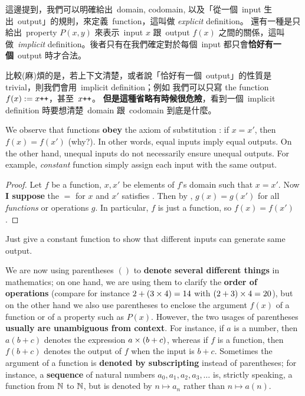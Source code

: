 \begin{note}
這邊提到，我們可以明確給出\ domain, codomain, 以及「從一個\ input 生出\  output」的規則，來定義\ function，這叫做 \emph{explicit} definition。
還有一種是只給出\ property \(P(x, y)\) 來表示\ input \(x\) 跟\ output \(f(x)\) 之間的關係，這叫做\ \emph{implicit} definition。後者只有在我們確定對於每個\ input 都只會\textbf{恰好有一個}\ output 時才合法。
\end{note}

\begin{note}
比較(麻)煩的是，若上下文清楚，或者說「恰好有一個\ output」的性質是 trivial，則我們會用\ implicit definition；例如  我們可以只寫 the function \(f(x) := x\texttt{++}\)，甚至\  \(x\texttt{++}\)。
\textbf{但是這種省略有時候很危險}，看到一個\ implicit definition 時要想清楚\ domain 跟\ codomain 到底是什麼。
\end{note}

\begin{note}
We observe that functions \textbf{obey} the axiom of substitution : if \(x = x'\), then \(f(x) = f(x')\) (why?).
In other words, equal inputs imply equal outputs. On the other hand, unequal inputs do not necessarily ensure unequal outputs.
For example, \emph{constant} function simply assign each input with the same output.
\end{note}

\begin{proof}
Let \(f\) be a function, \(x, x'\) be elements of \(f\)'s domain such that \(x = x'\). Now \textbf{I suppose} the \(=\) for \(x\) and \(x'\) satisfies . Then by , \(g(x) = g(x')\) for all \emph{functions} or operations \(g\). In particular, \(f\) is just a function, so \(f(x) = f(x')\).
\end{proof}

\begin{example}
Just give a constant function to show that different inputs can generate same output.
\end{example}

\begin{remark} \label{remark 3.3.5}
We are now using parentheses \(()\) to \textbf{denote several different things} in mathematics;
on one hand, we are using them to clarify the \textbf{order of operations} (compare for instance \(2 + (3 \times 4) = 14\) with \((2 + 3) \times 4 = 20\)),
but on the other hand we also use parentheses to enclose the argument \(f(x)\) of a function or of a property such as \(P(x)\).
However, the two usages of parentheses \textbf{usually are unambiguous from context}.
For instance, if \(a\) is a number, then \(a(b + c)\) denotes the expression \(a \times (b + c)\), whereas if \(f\) is a function, then \(f(b + c)\) denotes the output of \(f\) when the input is \(b + c\).
Sometimes the argument of a function is \textbf{denoted by subscripting} instead of parentheses;
for instance, a \textbf{sequence} of natural numbers \(a_0, a_1, a_2, a_3, \dots\) is, strictly speaking, a function from \(\mathbb{N}\) to \(\mathbb{N}\), but is denoted by \(n \mapsto a_n\) rather than \(n \mapsto a(n)\).
\end{remark}

